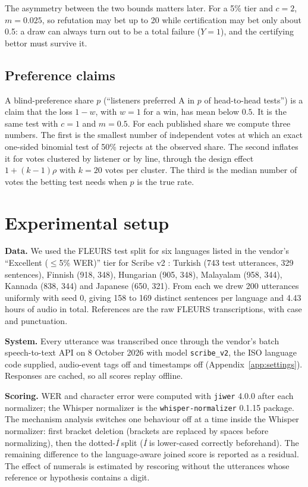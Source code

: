 The asymmetry between the two bounds matters later. For a 5\% tier and $c = 2$, $m = 0.025$, so refutation may bet up to 20 while certification may bet only about 0.5: a draw can always turn out to be a total failure ($Y = 1$), and the certifying bettor must survive it.

\subsection{Preference claims}

A blind-preference share $p$ (``listeners preferred A in $p$ of head-to-head tests'') is a claim that the loss $1 - w$, with $w = 1$ for a win, has mean below $0.5$. It is the same test with $c = 1$ and $m = 0.5$. For each published share we compute three numbers. The first is the smallest number of independent votes at which an exact one-sided binomial test of 50\% rejects at the observed share. The second inflates it for votes clustered by listener or by line, through the design effect $1 + (k-1)\rho$ with $k = 20$ votes per cluster. The third is the median number of votes the betting test needs when $p$ is the true rate.

\section{Experimental setup}
\label{sec:setup}

\textbf{Data.} We used the FLEURS test split \citep{conneau2022fleurs} for six languages listed in the vendor's ``Excellent ($\le$5\% WER)'' tier for Scribe v2 \citep{elevenlabs2026sttdocs}: Turkish (743 test utterances, 329 sentences), Finnish (918, 348), Hungarian (905, 348), Malayalam (958, 344), Kannada (838, 344) and Japanese (650, 321). From each we drew 200 utterances uniformly with seed 0, giving 158 to 169 distinct sentences per language and 4.43 hours of audio in total. References are the raw FLEURS transcriptions, with case and punctuation.

\textbf{System.} Every utterance was transcribed once through the vendor's batch speech-to-text API on 8 October 2026 with model \texttt{scribe\_v2}, the ISO language code supplied, audio-event tags off and timestamps off (Appendix~\ref{app:settings}). Responses are cached, so all scores replay offline.

\textbf{Scoring.} WER and character error were computed with \texttt{jiwer} 4.0.0 after each normalizer; the Whisper normalizer is the \texttt{whisper-normalizer} 0.1.15 package. The mechanism analysis switches one behaviour off at a time inside the Whisper normalizer: first bracket deletion (brackets are replaced by spaces before normalizing), then the dotted-\emph{\.I} split (\emph{\.I} is lower-cased correctly beforehand). The remaining difference to the language-aware joined score is reported as a residual. The effect of numerals is estimated by rescoring without the utterances whose reference or hypothesis contains a digit.

